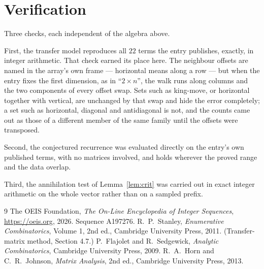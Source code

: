 \documentclass[11pt,a4paper]{article}
\theoremstyle{plain}
\theoremstyle{definition}
\begin{document}
\section{Verification}

Three checks, each independent of the algebra above.

First, the transfer model reproduces all $22$ terms the entry publishes, exactly, in
integer arithmetic. That check earned its place here. The neighbour offsets are named in the
array's own frame --- horizontal means along a row --- but when the entry fixes the first
dimension, as in ``$2\times n$'', the walk runs along columns and the two components of every
offset swap. Sets such as king-move, or horizontal together with vertical, are unchanged by
that swap and hide the error completely; a set such as horizontal, diagonal and antidiagonal
is not, and the counts came out as those of a different member of the same family until the
offsets were transposed.

Second, the conjectured recurrence was evaluated directly on the entry's own published terms,
with no matrices involved, and holds wherever the proved range and the data overlap.

Third, the annihilation test of Lemma~\ref{lem:crit} was carried out in exact integer
arithmetic on the whole vector rather than on a sampled prefix.

\begin{thebibliography}{9}
 The OEIS Foundation, \emph{The On-Line Encyclopedia of Integer
Sequences}, \url{https://oeis.org}, 2026. Sequence A197276.
 R.~P.~Stanley, \emph{Enumerative Combinatorics}, Volume 1, 2nd ed.,
Cambridge University Press, 2011. (Transfer-matrix method, Section 4.7.)
 P.~Flajolet and R.~Sedgewick, \emph{Analytic Combinatorics}, Cambridge
University Press, 2009.
 R.~A.~Horn and C.~R.~Johnson, \emph{Matrix Analysis}, 2nd ed., Cambridge
University Press, 2013.
\end{thebibliography}
\end{document}
